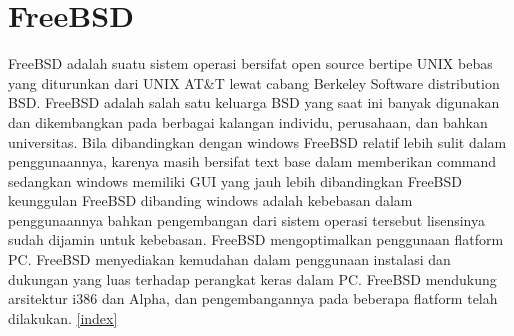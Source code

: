 ﻿%
\section{FreeBSD}
	FreeBSD adalah suatu sistem operasi bersifat open source bertipe UNIX bebas yang diturunkan dari UNIX AT\&T lewat cabang Berkeley Software distribution
	BSD. FreeBSD adalah salah satu keluarga BSD yang saat ini banyak digunakan dan dikembangkan pada berbagai kalangan individu,
	perusahaan, dan bahkan universitas. Bila dibandingkan dengan windows FreeBSD relatif lebih sulit dalam penggunaannya, karenya masih bersifat text base
	dalam memberikan command sedangkan windows memiliki GUI yang jauh lebih dibandingkan FreeBSD keunggulan FreeBSD dibanding windows
	adalah kebebasan dalam penggunaannya bahkan pengembangan dari sistem operasi tersebut lisensinya sudah dijamin untuk kebebasan.
	FreeBSD mengoptimalkan penggunaan flatform PC. FreeBSD menyediakan kemudahan dalam penggunaan instalasi dan dukungan yang luas terhadap perangkat keras dalam PC.
	FreeBSD mendukung arsitektur i386 dan Alpha, dan pengembangannya pada beberapa flatform telah dilakukan. \ref{index} \label{index} 
